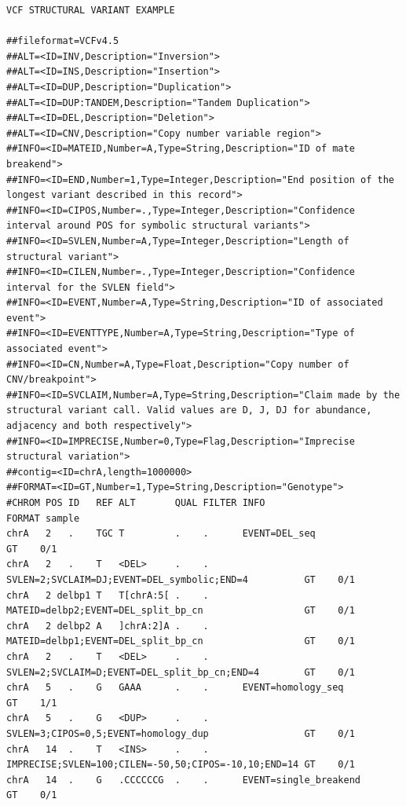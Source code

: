 \documentclass[8pt]{article}
\begin{document}
\pagebreak
\footnotesize
\begin{landscape}
\begin{verbatim}
VCF STRUCTURAL VARIANT EXAMPLE

##fileformat=VCFv4.5
##ALT=<ID=INV,Description="Inversion">
##ALT=<ID=INS,Description="Insertion">
##ALT=<ID=DUP,Description="Duplication">
##ALT=<ID=DUP:TANDEM,Description="Tandem Duplication">
##ALT=<ID=DEL,Description="Deletion">
##ALT=<ID=CNV,Description="Copy number variable region">
##INFO=<ID=MATEID,Number=A,Type=String,Description="ID of mate breakend">
##INFO=<ID=END,Number=1,Type=Integer,Description="End position of the longest variant described in this record">
##INFO=<ID=CIPOS,Number=.,Type=Integer,Description="Confidence interval around POS for symbolic structural variants">
##INFO=<ID=SVLEN,Number=A,Type=Integer,Description="Length of structural variant">
##INFO=<ID=CILEN,Number=.,Type=Integer,Description="Confidence interval for the SVLEN field">
##INFO=<ID=EVENT,Number=A,Type=String,Description="ID of associated event">
##INFO=<ID=EVENTTYPE,Number=A,Type=String,Description="Type of associated event">
##INFO=<ID=CN,Number=A,Type=Float,Description="Copy number of CNV/breakpoint">
##INFO=<ID=SVCLAIM,Number=A,Type=String,Description="Claim made by the structural variant call. Valid values are D, J, DJ for abundance, adjacency and both respectively">
##INFO=<ID=IMPRECISE,Number=0,Type=Flag,Description="Imprecise structural variation">
##contig=<ID=chrA,length=1000000>
##FORMAT=<ID=GT,Number=1,Type=String,Description="Genotype">
#CHROM POS ID   REF ALT       QUAL FILTER INFO                                             FORMAT sample
chrA   2   .    TGC T         .    .      EVENT=DEL_seq                                        GT    0/1
chrA   2   .    T   <DEL>     .    .      SVLEN=2;SVCLAIM=DJ;EVENT=DEL_symbolic;END=4          GT    0/1
chrA   2 delbp1 T   T[chrA:5[ .    .      MATEID=delbp2;EVENT=DEL_split_bp_cn                  GT    0/1
chrA   2 delbp2 A   ]chrA:2]A .    .      MATEID=delbp1;EVENT=DEL_split_bp_cn                  GT    0/1
chrA   2   .    T   <DEL>     .    .      SVLEN=2;SVCLAIM=D;EVENT=DEL_split_bp_cn;END=4        GT    0/1
chrA   5   .    G   GAAA      .    .      EVENT=homology_seq                                   GT    1/1
chrA   5   .    G   <DUP>     .    .      SVLEN=3;CIPOS=0,5;EVENT=homology_dup                 GT    0/1
chrA   14  .    T   <INS>     .    .      IMPRECISE;SVLEN=100;CILEN=-50,50;CIPOS=-10,10;END=14 GT    0/1
chrA   14  .    G   .CCCCCCG  .    .      EVENT=single_breakend                                GT    0/1
\end{verbatim}
\end{landscape}
\pagebreak
\normalsize
\end{document}
